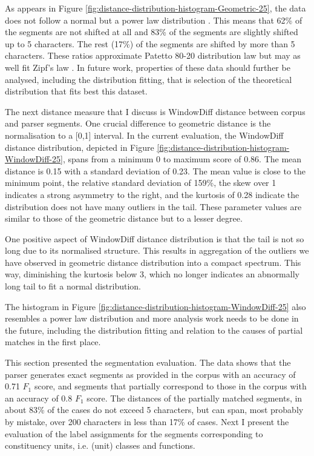     As appears in Figure \ref{fig:distance-distribution-histogram-Geometric-25}, the data does not follow a normal but a power law distribution \citep{newman2005power}. This means that 62\% of the segments are not shifted at all and 83\% of the segments are slightly shifted up to 5 characters. The rest (17\%) of the segments are shifted by more than 5 characters. These ratios approximate Patetto 80-20 distribution law but may as well fit Zipf's law \citep{newman2005power}. In future work, properties of these data should further be analysed, including the distribution fitting, that is selection of the theoretical distribution that fits best this dataset.
    
    The next distance measure that I discuss is WindowDiff distance between corpus and parser segments. One crucial difference to geometric distance is the normalisation to a [0,1] interval. In the current evaluation, the WindowDiff distance distribution, depicted in Figure \ref{fig:distance-distribution-histogram-WindowDiff-25}, spans from a minimum 0 to maximum score of 0.86. The mean distance is 0.15 with a standard deviation of 0.23. The mean value is close to the minimum point, the relative standard deviation of 159\%, the skew over 1 indicates a strong asymmetry to the right, and the kurtosis of 0.28 indicate the distribution does not have many outliers in the tail. These parameter values are similar to those of the geometric distance but to a lesser degree. 
    
    One positive aspect of WindowDiff distance distribution is that the tail is not so long due to its normalised structure. This results in aggregation of the outliers we have observed in geometric distance distribution into a compact spectrum. This way, diminishing the kurtosis below 3, which no longer indicates an abnormally long tail to fit a normal distribution. 
    
    The histogram in Figure \ref{fig:distance-distribution-histogram-WindowDiff-25} also resembles a power law distribution and more analysis work needs to be done in the future, including the distribution fitting and relation to the causes of partial matches in the first place. 
    
    This section presented the segmentation evaluation. The data shows that the parser generates exact segments as provided in the corpus with an accuracy of 0.71 $F_1$ score, and segments that partially correspond to those in the corpus with an accuracy of 0.8 $F_1$ score. The distances of the partially matched segments, in about 83\% of the cases do not exceed 5 characters, but can span, most probably by mistake, over 200 characters in less than 17\% of cases. Next I present the evaluation of the label assignments for the segments corresponding to constituency units, i.e. (unit) classes and functions.

